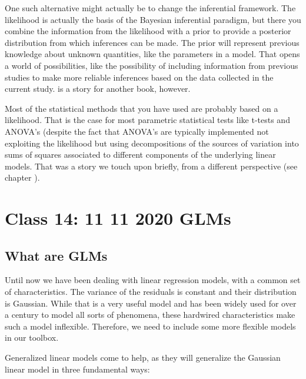 \documentclass[
]{book}
\begin{document}
One such alternative might actually be to change the inferential framework. The likelihood is actually the basis of the Bayesian inferential paradigm, but there you combine the information from the likelihood with a prior to provide a posterior distribution from which inferences can be made. The prior will represent previous knowledge about unknown quantities, like the parameters in a model. That opens a world of possibilities, like the possibility of including information from previous studies to make more reliable inferences based on the data collected in the current study. is a story for another book, however.

Most of the statistical methods that you have used are probably based on a likelihood. That is the case for most parametric statistical tests like t-tests and ANOVA's (despite the fact that ANOVA's are typically implemented not exploiting the likelihood but using decompositions of the sources of variation into sums of squares associated to different components of the underlying linear models. That was a story we touch upon briefly, from a different perspective (see chapter ).

\hypertarget{aula14}{%
\chapter{Class 14: 11 11 2020 GLMs}\label{aula14}}

\hypertarget{what-are-glms}{%
\section{What are GLMs}\label{what-are-glms}}

Until now we have been dealing with linear regression models, with a common set of characteristics. The variance of the residuals is constant and their distribution is Gaussian. While that is a very useful model and has been widely used for over a century to model all sorts of phenomena, these hardwired characteristics make such a model inflexible. Therefore, we need to include some more flexible models in our toolbox.

Generalized linear models come to help, as they will generalize the Gaussian linear model in three fundamental ways:
\end{document}

